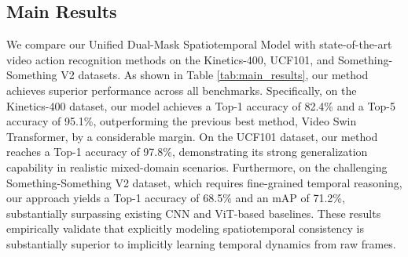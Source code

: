 \documentclass[lettersize,journal]{IEEEtran}
\begin{document}
\subsection{Main Results}
We compare our Unified Dual-Mask Spatiotemporal Model with state-of-the-art video action recognition methods on the Kinetics-400, UCF101, and Something-Something V2 datasets. As shown in Table \ref{tab:main_results}, our method achieves superior performance across all benchmarks. Specifically, on the Kinetics-400 dataset, our model achieves a Top-1 accuracy of 82.4\% and a Top-5 accuracy of 95.1\%, outperforming the previous best method, Video Swin Transformer, by a considerable margin. On the UCF101 dataset, our method reaches a Top-1 accuracy of 97.8\%, demonstrating its strong generalization capability in realistic mixed-domain scenarios. Furthermore, on the challenging Something-Something V2 dataset, which requires fine-grained temporal reasoning, our approach yields a Top-1 accuracy of 68.5\% and an mAP of 71.2\%, substantially surpassing existing CNN and ViT-based baselines. These results empirically validate that explicitly modeling spatiotemporal consistency is substantially superior to implicitly learning temporal dynamics from raw frames.

\begin{table}[t]
\centering
\caption{Comparison with State-of-the-Art Methods on Video Action Recognition Benchmarks}
\label{tab:main_results}
\end{table}
\end{document}
